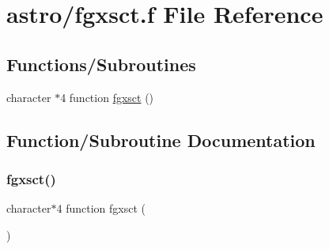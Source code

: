 \hypertarget{fgxsct_8f}{}\section{astro/fgxsct.f File Reference}
\label{fgxsct_8f}
\subsection*{Functions/\+Subroutines}
\begin{DoxyCompactItemize}
\item 
character $\ast$4 function \hyperlink{fgxsct_8f_a2805ee09934821f769c7344e757d7b71}{fgxsct} ()
\end{DoxyCompactItemize}


\subsection{Function/\+Subroutine Documentation}
\mbox{\label{fgxsct_8f_a2805ee09934821f769c7344e757d7b71}} 
\subsubsection{\texorpdfstring{fgxsct()}{fgxsct()}}
{\footnotesize\ttfamily character$\ast$4 function fgxsct (\begin{DoxyParamCaption}{ }\end{DoxyParamCaption})}

